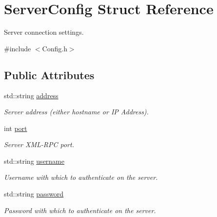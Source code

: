 \hypertarget{structServerConfig}{\section{Server\-Config Struct Reference}
\label{structServerConfig}
}


Server connection settings.  




{\ttfamily \#include $<$Config.\-h$>$}

\subsection*{Public Attributes}
\begin{DoxyCompactItemize}
\item 
\hypertarget{structServerConfig_a2a4201c0c868ba962a57d75b07ddafaf}{std\-::string \hyperlink{structServerConfig_a2a4201c0c868ba962a57d75b07ddafaf}{address}}\label{structServerConfig_a2a4201c0c868ba962a57d75b07ddafaf}

\begin{DoxyCompactList}\small\item\em Server address (either hostname or I\-P Address). \end{DoxyCompactList}\item 
\hypertarget{structServerConfig_ae459946703124ef5a1d98dba38a8b493}{int \hyperlink{structServerConfig_ae459946703124ef5a1d98dba38a8b493}{port}}\label{structServerConfig_ae459946703124ef5a1d98dba38a8b493}

\begin{DoxyCompactList}\small\item\em Server X\-M\-L-\/\-R\-P\-C port. \end{DoxyCompactList}\item 
\hypertarget{structServerConfig_ad2216f13f13acbe6bfd61f275bc72e27}{std\-::string \hyperlink{structServerConfig_ad2216f13f13acbe6bfd61f275bc72e27}{username}}\label{structServerConfig_ad2216f13f13acbe6bfd61f275bc72e27}

\begin{DoxyCompactList}\small\item\em Username with which to authenticate on the server. \end{DoxyCompactList}\item 
\hypertarget{structServerConfig_a819f5b912feb1fdb68ebd4fe36eb11ea}{std\-::string \hyperlink{structServerConfig_a819f5b912feb1fdb68ebd4fe36eb11ea}{password}}\label{structServerConfig_a819f5b912feb1fdb68ebd4fe36eb11ea}

\begin{DoxyCompactList}\small\item\em Password with which to authenticate on the server. \end{DoxyCompactList}\end{DoxyCompactItemize}


